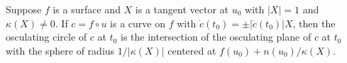 Suppose $f$ is a surface and $X$ is a tangent vector at $u_0$ with $|X| = 1$ and $\kappa(X) \neq 0$. If $c = f \circ u$ is a curve on $f$ with $\dot{c}(t_0) = \pm |\dot{c}(t_0)| X$, then the osculating circle of $c$ at $t_0$ is the intersection of the osculating plane of $c$ at $t_0$ with the sphere of radius $1/|\kappa(X)|$ centered at $f(u_0) + n(u_0)/\kappa(X)$.
